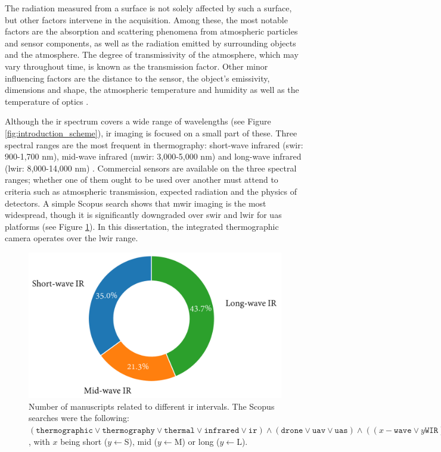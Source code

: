 The radiation measured from a surface is not solely affected by such a surface, but other factors intervene in the acquisition. Among these, the most notable factors are the absorption and scattering phenomena from atmospheric particles and sensor components, as well as the radiation emitted by surrounding objects and the atmosphere. The degree of transmissivity of the atmosphere, which may vary throughout time, is known as the transmission factor. Other minor influencing factors are the distance to the sensor, the object's emissivity, dimensions and shape, the atmospheric temperature and humidity as well as the temperature of optics \cite{vollmer_infrared_2017}. 

Although the \acrshort{ir} spectrum covers a wide range of wavelengths (see Figure \ref{fig:introduction_scheme}), \acrshort{ir} imaging is focused on a small part of these. Three spectral ranges are the most frequent in thermography: short-wave infrared (\acrshort{swir}: 900-1,700 \si{\nano\meter}), mid-wave infrared (\acrshort{mwir}: 3,000-5,000 \si{\nano\meter}) and long-wave infrared (\acrshort{lwir}: 8,000-14,000 \si{\nano\meter}) \cite{gade_thermal_2014, vollmer_infrared_2017}. Commercial sensors are available on the three spectral ranges; whether one of them ought to be used over another must attend to criteria such as atmospheric transmission, expected radiation and the physics of detectors. A simple Scopus search shows that \acrshort{mwir} imaging is the most widespread, though it is significantly downgraded over \acrshort{swir} and \acrshort{lwir} for \acrshort{uas} platforms (see Figure \ref{fig:infrared_scopus}). In this dissertation, the integrated thermographic camera operates over the \acrshort{lwir} range. 

\begin{figure}[ht]
	\includegraphics[width=.75\textwidth]{figs/fundamentals/infrared.png}
	\caption{Number of manuscripts related to different \acrshort{ir} intervals. The Scopus searches were the following: $(\mathtt{thermographic} \lor \mathtt{thermography} \lor \mathtt{thermal} \lor \mathtt{infrared} \lor \mathtt{ir}) \land (\mathtt{drone} \lor \mathtt{uav} \lor \mathtt{uas}) \land ((x-\mathtt{wave} \lor y\mathtt{WIR}))$, with $x$ being short ($y \gets $S), mid ($y \gets $M) or long ($y \gets $L). }
    \label{fig:infrared_scopus}
\end{figure}

